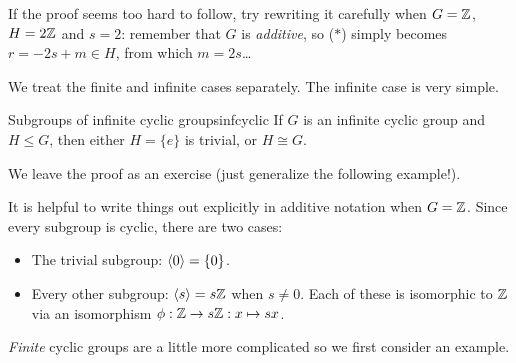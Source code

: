 If the proof seems too hard to follow, try rewriting it carefully when $G=\mathbb{Z}$, $H=2\mathbb{Z}$ and $s=2$: remember that $G$ is \emph{additive}, so ($\ast$) simply becomes $r=-2s+m\in H$, from which $m=2s$\ldots


\goodbreak

We treat the finite and infinite cases separately. The infinite case is very simple.

\begin{cor}{Subgroups of infinite cyclic groups}{infcyclic}
	If $G$ is an infinite cyclic group and $H\le G$, then either $H=\{e\}$ is trivial, or $H\cong G$.
\end{cor}

We leave the proof as an exercise (just generalize the following example!).

\begin{example}{}{}
	It is helpful to write things out explicitly in additive notation when $G=\mathbb{Z}$. Since every subgroup is cyclic, there are two cases:
	\begin{itemize}\itemsep2pt
	  \item The trivial subgroup: $\left\langle 0\right\rangle=\{0\}$.
	  \item Every other subgroup: $\left\langle s\right\rangle=s\mathbb{Z}$ when $s\neq 0$. Each of these is isomorphic to $\mathbb{Z}$ via an isomorphism $\phi:\mathbb{Z}\to s\mathbb{Z}:x\mapsto sx$.
	\end{itemize}
\end{example}


\smallskip


\emph{Finite} cyclic groups are a little more complicated so we first consider an example.

